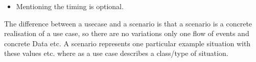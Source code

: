 \begin{parlist}
\begin{enumerate}
\begin{itemize}
					\item Mentioning the timing is optional.
				\end{itemize}			
		\end{enumerate}
	\item The difference between a usecase and a scenario is that a scenario is a concrete realisation of a use case, so there are no variations only one flow of events and concrete Data etc. A scenario represents one particular example situation with these values etc. where as a use case describes a class/type of situation. 
\end{parlist}

